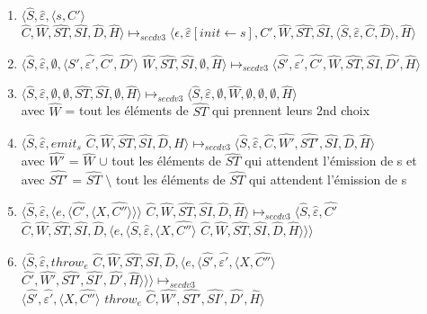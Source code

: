 \documentclass[10pt,a4paper]{article}
\begin{document}
\begin{enumerate}
				    \item $\langle\widehat{S},\widehat{\varepsilon},\langle s, C'\rangle$ $\widehat{C},\widehat{W},\widehat{ST},\widehat{SI},\widehat{D},\widehat{H}\rangle \longmapsto_{secdv3} \langle\epsilon,\widehat{\varepsilon}[init \leftarrow s],C',\widehat{W},\widehat{ST},\widehat{SI},\langle\widehat{S},\widehat{\varepsilon},\widehat{C},\widehat{D}\rangle,\widehat{H}\rangle$
					\item $\langle\widehat{S},\widehat{\varepsilon},\emptyset,\langle\widehat{S'},\widehat{\varepsilon'},\widehat{C'},\widehat{D'}\rangle$ $\widehat{W},\widehat{ST},\widehat{SI},\emptyset,\widehat{H}\rangle \longmapsto_{secdv3} \langle\widehat{S'},\widehat{\varepsilon'},\widehat{C'},\widehat{W},\widehat{ST},\widehat{SI},\widehat{D'},\widehat{H}\rangle$
					\item  $\langle\widehat{S},\widehat{\varepsilon},\emptyset,\emptyset,\widehat{ST},\widehat{SI},\emptyset,\widehat{H}\rangle \longmapsto_{secdv3} \langle\widehat{S},\widehat{\varepsilon},\emptyset,\widehat{W},\emptyset,\emptyset,\emptyset,\widehat{H}\rangle$\\ avec $\widehat{W}$ = tout les éléments de $\widehat{ST}$ qui prennent leurs 2nd choix 
					\item $\langle\widehat{S},\widehat{\varepsilon},emit_{s}$ $\widehat{C},\widehat{W},\widehat{ST},\widehat{SI},\widehat{D},\widehat{H}\rangle \longmapsto_{secdv3} \langle \widehat{S},\widehat{\varepsilon},\widehat{C},\widehat{W'},\widehat{ST'},\widehat{SI},\widehat{D},\widehat{H}\rangle$\\ avec $\widehat{W'}$ = $\widehat{W}$ $\cup$ tout les éléments de $\widehat{ST}$ qui attendent l'émission de s et\\
					avec $\widehat{ST'}$ = $\widehat{ST}$ $\setminus$ tout les éléments de $\widehat{ST}$ qui attendent l'émission de s
					\item $\langle\widehat{S},\widehat{\varepsilon},\langle e,\langle\widehat{C'},\langle X,\widehat{C''}\rangle\rangle\rangle$ $\widehat{C},\widehat{W},\widehat{ST},\widehat{SI},\widehat{D},\widehat{H}\rangle \longmapsto_{secdv3} \langle\widehat{S},\widehat{\varepsilon},\widehat{C'}$ $\widehat{C},\widehat{W},\widehat{ST},\widehat{SI},\widehat{D},\langle e,\langle\widehat{S},\widehat{\varepsilon},\langle X,\widehat{C''}\rangle$ $\widehat{C},\widehat{W},\widehat{ST},\widehat{SI},\widehat{D},\widehat{H}\rangle\rangle\rangle$
					\item $\langle\widehat{S},\widehat{\varepsilon},throw_{e}$ $\widehat{C},\widehat{W},\widehat{ST},\widehat{SI},\widehat{D},\langle e,\langle\widehat{S'},\widehat{\varepsilon'},\langle X,\widehat{C''}\rangle$ $\widehat{C'},\widehat{W'},\widehat{ST'},\widehat{SI'},\widehat{D'},\widehat{H}\rangle\rangle\rangle \longmapsto_{secdv3}$\\$ \langle\widehat{S'},\widehat{\varepsilon'},\langle X,\widehat{C''}\rangle$ $throw_{e}$ $\widehat{C},\widehat{W'},\widehat{ST'},\widehat{SI'},\widehat{D'},\widehat{H}\rangle$

\end{enumerate}
\end{document}
